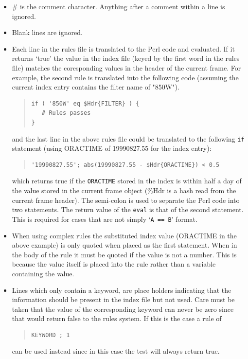 \documentclass[twoside,11pt]{article}
\renewcommand{\_}{\texttt{\symbol{95}}}
\newenvironment{myquote}{\begin{quote}\begin{small}}{\end{small}\end{quote}}
\begin{document}
\begin{itemize}
\item \# is the comment character. Anything after a comment within a
  line is ignored.
\item Blank lines are ignored.
\item Each line in the rules file is translated to the Perl code and
evaluated. If it returns `true' the value in the index file (keyed by
the first word in the rules file) matches the coresponding values in
the header of the current frame. For example, the second rule
is translated into the following code (assuming the current index
entry contains the filter name of "850W").

\begin{myquote}
\begin{verbatim}
if ( '850W' eq $Hdr{FILTER} ) {
   # Rules passes
}
\end{verbatim}
\end{myquote}
and the last line in the above rules file could be translated to the
following \texttt{if} statement (using ORACTIME of 19990827.55 for the
index entry):
\begin{myquote}
\begin{verbatim}
'19990827.55'; abs(19990827.55 - $Hdr{ORACTIME}) < 0.5 
\end{verbatim}
\end{myquote} %
which returns true if the \texttt{ORACTIME} stored in the index is
within half a day of the value stored in the current frame object
(\%Hdr is a hash read from the current frame header).
The semi-colon is used to separate the Perl code into two statements.
The return value of the \texttt{eval} is that of the second statement. This is
required for cases that are not simply `\texttt{A == B}' format.
\item When using complex rules the substituted index value (ORACTIME
  in the above example) is only quoted when
placed as the first statement. When in the body of the rule it must be 
quoted if the value is not a number. This is because the value itself
is placed into the rule rather than a variable containing the value.
\item Lines which only contain a keyword, are place holders indicating
that the information should be present in the index file but not used.
Care must be taken that the value of the corresponding keyword can never
be zero since that would return false to the rules system. If this is the 
case a rule of
\begin{myquote}
\begin{verbatim}
KEYWORD ; 1
\end{verbatim}
\end{myquote}
can be used instead since in this case the test will always return true.
\end{itemize}
\end{document}
